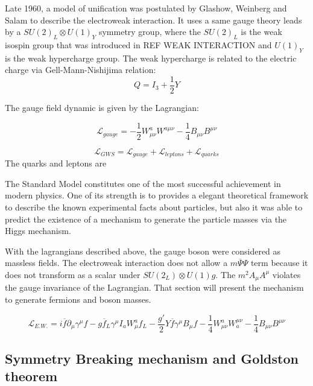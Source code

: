     Late 1960, a model of unification was postulated by Glashow, Weinberg and Salam to describe the electroweak interaction.
    It uses a same gauge theory leads by a $SU(2)_L \otimes U(1)_Y$ symmetry group, where the $SU(2)_L$ is the weak isospin group that was introduced in REF WEAK INTERACTION and $U(1)_Y$ is the weak hypercharge group.
    The weak hypercharge is related to the electric charge via Gell-Mann-Nishijima relation:
    \begin{equation}
      Q = I_3 + \frac{1}{2}Y
    \end{equation}

    The gauge field dynamic is given by the Lagrangian:

    \begin{equation}
        \mathcal{L}_{gauge} = - \frac{1}{2}W^a_{\mu\nu} W^{a\mu\nu} - \frac{1}{4}B_{\mu\nu}B^{\mu\nu}
    \end{equation}


    \begin{equation}
        \mathcal{L}_{GWS} = \mathcal{L}_{gauge} + \mathcal{L}_{leptons} + \mathcal{L}_{quarks}
    \end{equation}
    The quarks and leptons are 
    
    
    The Standard Model constitutes one of the most successful achievement in modern physics.
    One of its strength is to provides a elegant theoretical framework to describe the known experimental facts about particles, but also it was able to predict 
    the existence of a mechanism to generate the particle masses via the Higgs mechanism.

    With the lagrangians described above, the gauge boson were considered as massless fields.
    The electroweak interaction does not allow a $m\overline{\Psi}\Psi$ term because it does not transform as a scalar under $SU(2_L)\otimes U(1)g$.
    The $m^2A_{\mu} A^{\mu}$ violates the gauge invariance of the Lagrangian.
    That section will present the mechanism to generate fermions and boson masses.

  \begin{equation}
    \mathcal{L}_{E.W.} = i \overline{f} \partial_{\mu} \gamma^{\mu}f - g \overline{f}_L \gamma^{\mu} I_a W^a_{\mu} f_L - \frac{g'}{2}Y \overline{f} \gamma^{\mu} B_{\mu} f
    - \frac{1}{4} W^a_{\mu \nu}W^{\mu \nu}_a - \frac{1}{4}B_{\mu \nu}B^{\mu \nu}
  \end{equation}  

    \subsection{Symmetry Breaking mechanism and Goldston theorem}
    
